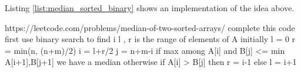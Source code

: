 Listing \ref{list:median_sorted_binary} shows an implementation of the idea above.




https://leetcode.com/problems/median-of-two-sorted-arrays/ complete this code first
use binary search to find i
l , r is the range of elements of A initially l = 0 r = min(n, (n+m)/2)
i = l+r/2
j = n+m-i
if max among A[i] and B[j] <= min A[i+1],B[j+1] we have a median
otherwise 
if A[i] > B[j] then r = i-1
else l = i+1
